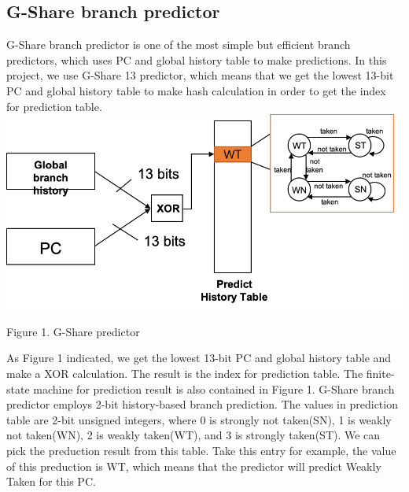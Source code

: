 \documentclass[conference]{IEEEtran}
\begin{document}
\subsection{G-Share branch predictor}
G-Share branch predictor is one of the most simple but efficient branch predictors, which uses PC and global history table to make predictions. In this project, we use G-Share 13 predictor, which means that 
we get the lowest 13-bit PC and global history table to make hash calculation in order to get the index for prediction table.
\includegraphics[width=\linewidth]{g-share.png}
\begin{center}
  {\small Figure 1. G-Share predictor}
\end{center}

As Figure 1 indicated, we get the lowest 13-bit PC and global history table and make a XOR calculation. The result is the index for prediction table.
The finite-state machine for prediction result is also contained in Figure 1. G-Share branch predictor employs 2-bit 
history-based branch prediction. The values in prediction table are 2-bit unsigned integers, 
where 0 is strongly not taken(SN), 1 is weakly not taken(WN), 2 is weakly taken(WT), and 3 is strongly taken(ST). We can pick the preduction result from this table. 
Take this entry for example, the value of this preduction is WT, which means that the predictor will predict Weakly Taken for this PC.  
\end{document}

